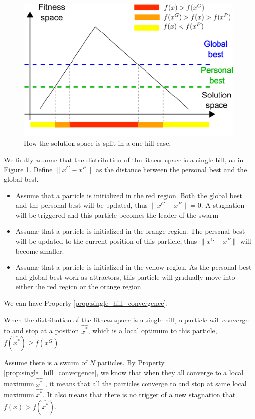 \begin{figure}
\centering
\includegraphics[width=0.7\linewidth]{./one_hill_case_region_split}
\caption{How the solution space is split in a one hill case.}
\label{fig:one_hill_case_split_region}
\end{figure}

We firstly assume that the distribution of the fitness space is a single hill, as in Figure \ref{fig:one_hill_case_split_region}.
Define $ \lVert x^{G} - x^{P} \rVert $ as the distance between the personal best and the global best.
\begin{itemize}
\item Assume that a particle is initialized in the red region.
Both the global best and the personal best will be updated, thus $ \lVert x^{G} - x^{P} \rVert = 0 $.
A stagnation will be triggered and this particle becomes the leader of the swarm.
\item Assume that a particle is initialized in the orange region.
The personal best will be updated to the current position of this particle, thus $ \lVert x^{G} - x^{P} \rVert $ will become smaller.
\item Assume that a particle is initialized in the yellow region.
As the personal best and global best work as attractors, this particle will gradually move into either the red region or the orange region.
\end{itemize}

We can have Property \ref{prop:single_hill_convergence}.

\begin{property}
\label{prop:single_hill_convergence}
When the distribution of the fitness space is a single hill, 
a particle will converge to and stop at a position $ \hat{ x^{*} } $, which is a local optimum to this particle, 
$ f( \hat{x^{*}} ) \geq f(x^{G}) $. 
\end{property}

Assume there is a swarm of $ N $ particles.
By Property \ref{prop:single_hill_convergence}, we know that when they all converge to a local maximum $ \hat{ x^{*} } $
, it means that all the particles converge to and stop at same local maximum $ \hat{ x^{*} } $.
It also means that there is no trigger of a new stagnation that $ f(x) > f( \hat{ x^{*} } ) $.

